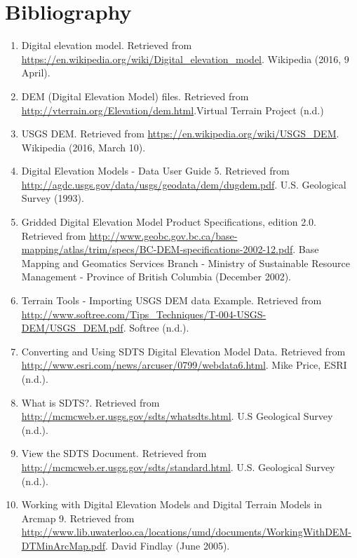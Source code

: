 \documentclass[11pt]{article}
\begin{document}
\section{Bibliography}
\begin{enumerate}[{(1)}]

\item Digital elevation model. Retrieved from \url{https://en.wikipedia.org/wiki/Digital_elevation_model}. Wikipedia (2016, 9 April).

\item DEM (Digital Elevation Model) files. Retrieved from \url{http://vterrain.org/Elevation/dem.html}.Virtual Terrain Project (n.d.)

\item USGS DEM. Retrieved from \url{https://en.wikipedia.org/wiki/USGS_DEM}. Wikipedia (2016, March 10).

\item Digital Elevation Models - Data User Guide 5. Retrieved from \url{http://agdc.usgs.gov/data/usgs/geodata/dem/dugdem.pdf}. U.S. Geological Survey (1993).

\item Gridded Digital Elevation Model Product Specifications, edition 2.0. Retrieved from \url{http://www.geobc.gov.bc.ca/base-mapping/atlas/trim/specs/BC-DEM-specifications-2002-12.pdf}. Base Mapping and Geomatics Services Branch - Ministry of Sustainable Resource Management - Province of British Columbia (December 2002).

\item Terrain Tools - Importing USGS DEM data Example. Retrieved from \url{http://www.softree.com/Tips_Techniques/T-004-USGS-DEM/USGS_DEM.pdf}. Softree (n.d.).

\item Converting and Using SDTS Digital Elevation Model Data. Retrieved from \url{http://www.esri.com/news/arcuser/0799/webdata6.html}. Mike Price, ESRI (n.d.). 

\item What is SDTS?. Retrieved from \url{http://mcmcweb.er.usgs.gov/sdts/whatsdts.html}. U.S Geological Survey (n.d.). 

\item 
View the SDTS Document. Retrieved from \url{http://mcmcweb.er.usgs.gov/sdts/standard.html}. U.S. Geological Survey (n.d.).

\item Working with Digital Elevation Models and Digital Terrain Models in Arcmap 9. Retrieved from \url{http://www.lib.uwaterloo.ca/locations/umd/documents/WorkingWithDEM-DTMinArcMap.pdf}. David Findlay (June 2005).


\end{enumerate}
\end{document}
